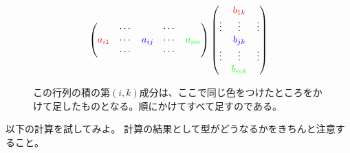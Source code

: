 \documentclass[10pt]{jsarticle}
\theoremstyle{definition}%
\numberwithin{equation}{section}%
\begin{document}
\begin{figure}[H]
  
\begin{equation}
  \left( 
   \begin{matrix}
            & \cdots &    & \cdots & \\
          \textcolor{red}{a_{i1}} & \cdots & \textcolor{blue}{a_{ij}}   & \cdots &  \textcolor{green}{a_{im}}  \\
            & \cdots &     & \cdots & 
   \end{matrix}
 \right)    \left( 
  \begin{matrix}
           & \textcolor{red}{b_{1k}} & \\
    \vdots & \vdots & \vdots\\
           & \textcolor{blue}{b_{jk}} & \\
    \vdots & \vdots & \vdots \\
           & \textcolor{green}{b_{mk}} & 
  \end{matrix}
\right)
\end{equation}
  \caption{この行列の積の第$(i,k)$成分は、ここで同じ色をつけたところをかけて足したものとなる。順にかけてすべて足すのである。}
\end{figure}
以下の計算を試してみよ。
計算の結果として型がどうなるかをきちんと注意すること。
\end{document}
